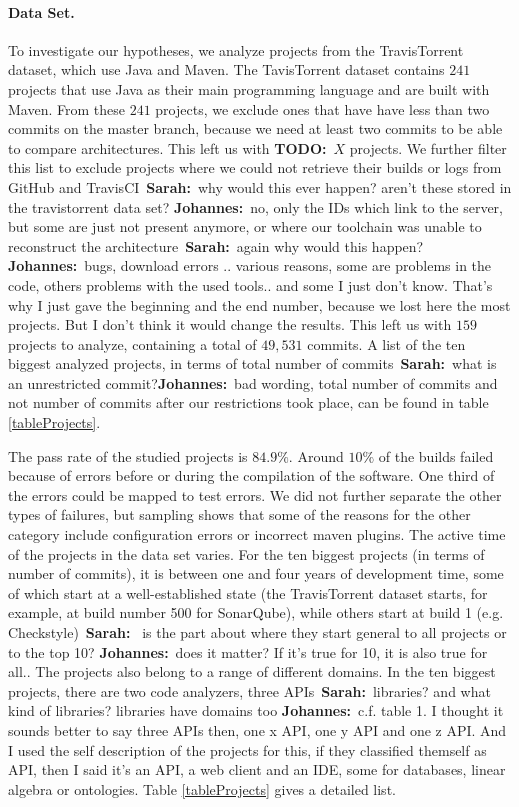 \documentclass[sigplan, anonymous, review]{acmart}
\newcommand{\sn}[1]{{\color{blue}\textbf{Sarah:}~#1}}
\newcommand{\jk}[1]{{\color{violet}\textbf{Johannes:}~#1}}
\newcommand{\todo}[1]{{ \color{red} \textbf{TODO:}~#1}}
\begin{document}
\paragraph{Data Set.}
To investigate our hypotheses, we analyze projects from the TravisTorrent dataset, which use Java and Maven. 
The TavisTorrent dataset contains $241$ projects that use Java as their main programming language and are built with Maven. 
From these $241$ projects, we exclude ones that have have less than two commits on the master branch, because we need at least two commits to be able to compare architectures. 
This left us with \todo{$X$} projects.
We further filter this list to exclude projects where we could not retrieve their builds or logs from GitHub and TravisCI~\sn{why would this ever happen? aren't these stored in the travistorrent data set?} \jk{no, only the IDs which link to the server, but some are just not present anymore}, or where our toolchain was unable to reconstruct the architecture~\sn{again why would this happen?} \jk{bugs, download errors .. various reasons, some are problems in the code, others problems with the used tools.. and some I just don't know. That's why I just gave the beginning and the end number, because we lost here the most projects. But I don't think it would change the results.}
This left us with $159$ projects to analyze, containing a total of
$49,531$ commits. A list of the ten biggest analyzed projects, in terms of total number of commits~\sn{what is an unrestricted commit?}\jk{bad wording, total number of commits and not number of commits after our restrictions took place}, can be found in table \ref{tableProjects}.

The pass rate of the studied projects is $84.9\%$. Around $10\%$ of the builds failed because of errors before or during the compilation of the software. One third of the errors could be mapped to test errors. We did not further separate the other types of failures, but sampling shows that some of the reasons for the other category include configuration errors or incorrect maven plugins.
The active time of the projects in the data set varies.
For the ten biggest projects (in terms of number of commits), it is between one and four years of development time, some of which start at a well-established state (the TravisTorrent dataset starts, for example, at build number 500 for SonarQube), while others start at build 1 (e.g. Checkstyle)~\sn{ is the part about where they start general to all projects or to the top 10?} \jk{does it matter? If it's true for 10, it is also true for all.}.
The projects also belong to a range of different domains.
In the ten biggest projects, there are two code analyzers, three APIs~\sn{libraries? and what kind of libraries? libraries have domains too} \jk{c.f. table 1. I thought it sounds better to say three APIs then, one x API, one y API and one z API. And I used the self description of the projects for this, if they classified themself as API, then I said it's an API}, a web client and an IDE, some for databases, linear algebra or ontologies. Table \ref{tableProjects} gives a detailed list.
\end{document}
